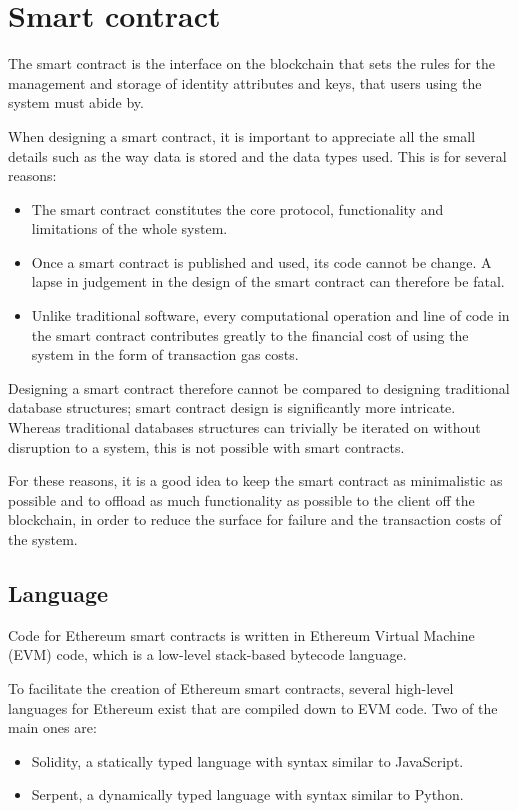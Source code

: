 \documentclass[12pt]{report}
\begin{document}
	\section{Smart contract}
	The smart contract is the interface on the blockchain that sets the rules for the management and storage of identity attributes and keys, that users using the system must abide by.
	
	When designing a smart contract, it is important to appreciate all the small details such as the way data is stored and the data types used. This is for several reasons:
	\begin{itemize}
		\item The smart contract constitutes the core protocol, functionality and limitations of the whole system.
		\item Once a smart contract is published and used, its code cannot be change. A lapse in judgement in the design of the smart contract can therefore be fatal.
		\item Unlike traditional software, every computational operation and line of code in the smart contract contributes greatly to the financial cost of using the system in the form of transaction gas costs.\cite{3}
	\end{itemize}
	Designing a smart contract therefore cannot be compared to designing traditional database structures; smart contract design is significantly more intricate. Whereas traditional databases structures can trivially be iterated on without disruption to a system, this is not possible with smart contracts.
	
	For these reasons, it is a good idea to keep the smart contract as minimalistic as possible and to offload as much functionality as possible to the client off the blockchain, in order to reduce the surface for failure and the transaction costs of the system.
	
	\subsection{Language}
	Code for Ethereum smart contracts is written in Ethereum Virtual Machine (EVM) code, which is a low-level stack-based bytecode language.\cite{3}
	
	To facilitate the creation of Ethereum smart contracts, several high-level languages for Ethereum exist that are compiled down to EVM code. Two of the main ones are:
	\begin{itemize}
		\item Solidity, a statically typed language with syntax similar to JavaScript.\cite{11}
		\item Serpent, a dynamically typed language with syntax similar to Python.\cite{12}
	\end{itemize}
	
\end{document}
